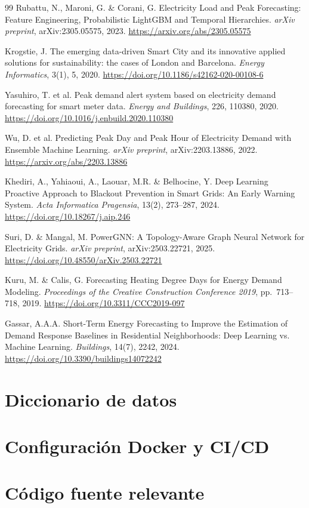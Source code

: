 \documentclass[12pt, a4paper]{article}
\begin{document}
\begin{thebibliography}{99}
Rubattu, N., Maroni, G. \& Corani, G. Electricity Load and Peak Forecasting: Feature Engineering, Probabilistic LightGBM and Temporal Hierarchies. \textit{arXiv preprint}, arXiv:2305.05575, 2023.
\url{https://arxiv.org/abs/2305.05575}

Krogstie, J. The emerging data-driven Smart City and its innovative applied solutions for sustainability: the cases of London and Barcelona. \textit{Energy Informatics}, 3(1), 5, 2020.
\url{https://doi.org/10.1186/s42162-020-00108-6}

Yasuhiro, T. et al. Peak demand alert system based on electricity demand forecasting for smart meter data. \textit{Energy and Buildings}, 226, 110380, 2020.
\url{https://doi.org/10.1016/j.enbuild.2020.110380}

Wu, D. et al. Predicting Peak Day and Peak Hour of Electricity Demand with Ensemble Machine Learning. \textit{arXiv preprint}, arXiv:2203.13886, 2022.
\url{https://arxiv.org/abs/2203.13886}

Khediri, A., Yahiaoui, A., Laouar, M.R. \& Belhocine, Y. Deep Learning Proactive Approach to Blackout Prevention in Smart Grids: An Early Warning System. \textit{Acta Informatica Pragensia}, 13(2), 273--287, 2024.
\url{https://doi.org/10.18267/j.aip.246}

Suri, D. \& Mangal, M. PowerGNN: A Topology-Aware Graph Neural Network for Electricity Grids. \textit{arXiv preprint}, arXiv:2503.22721, 2025.
\url{https://doi.org/10.48550/arXiv.2503.22721}

Kuru, M. \& Calis, G. Forecasting Heating Degree Days for Energy Demand Modeling. \textit{Proceedings of the Creative Construction Conference 2019}, pp.~713--718, 2019.
\url{https://doi.org/10.3311/CCC2019-097}

Gassar, A.A.A. Short-Term Energy Forecasting to Improve the Estimation of Demand Response Baselines in Residential Neighborhoods: Deep Learning vs. Machine Learning. \textit{Buildings}, 14(7), 2242, 2024.
\url{https://doi.org/10.3390/buildings14072242}

\end{thebibliography}

\newpage
\appendix

\section{Diccionario de datos}
\section{Configuración Docker y CI/CD}
\section{Código fuente relevante}
\end{document}

